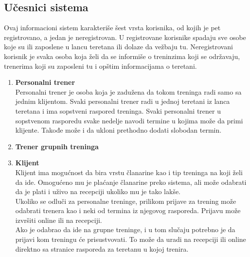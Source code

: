 \documentclass[../main.tex]{subfiles}
\begin{document}
\subsection{Učesnici sistema}
Ovaj informacioni sistem karakteriše šest vrsta korisnika, od kojih je pet registrovano, a jedan je neregistrovan. U registrovane korisnike spadaju sve osobe koje su ili zaposlene u lancu teretana ili dolaze da vežbaju tu. Neregistrovani korisnik je svaka osoba koja želi da se informiše o treninzima koji se održavaju, trenerima koji su zaposleni tu i opštim informacijama o teretani.
\begin{enumerate}
  \item \textbf{Personalni trener} \\
  Personalni trener je osoba koja je zadužena da tokom treninga radi samo sa jednim klijentom. Svaki personalni trener radi u jednoj teretani iz lanca teretana i ima sopstveni raspored treninga. Svaki personalni trener u sopstvenom rasporedu svake nedelje navodi termine u kojima može da primi klijente. Takođe može i da ukloni prethodno dodati slobodan termin.
  \item \textbf{Trener grupnih treninga} \\
  \item \textbf{Klijent} \\
  Klijent ima mogućnost da bira vrstu članarine kao i tip treninga na koji želi da ide. Omogućeno mu je plaćanje članarine preko sistema, ali može odabrati da je plati i uživo na recepciji ukoliko mu je tako lakše.\\ 
  Ukoliko se odluči za personalne treninge, prilikom prijave za trening može odabrati trenera kao i neki od termina iz njegovog rasporeda. Prijavu može izvršiti online ili na recepciji.\\
  Ako je odabrao da ide na grupne treninge, i u tom slučaju potrebno je da prijavi kom treningu će prisustvovati. To može da uradi na recepciji ili online direktno sa stranice rasporeda za teretanu u kojoj trenira. 
  

\end{enumerate}
\end{document}
